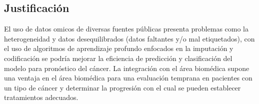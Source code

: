 \subsection{Justificación}

El uso de datos omicos de diversas fuentes públicas presenta problemas como la heterogeneidad y datos desequilibrados (datos faltantes y/o mal etiquetados), con el uso de algoritmos de aprendizaje profundo enfocados en la imputación y codificación se podría mejorar la eficiencia de predicción y clasificación del modelo para pronóstico del cáncer. La integración con el área biomédica supone una ventaja en el área biomédica para una evaluación temprana en pacientes con un tipo de cáncer y determinar la progresión con el cual se pueden establecer tratamientos adecuados.